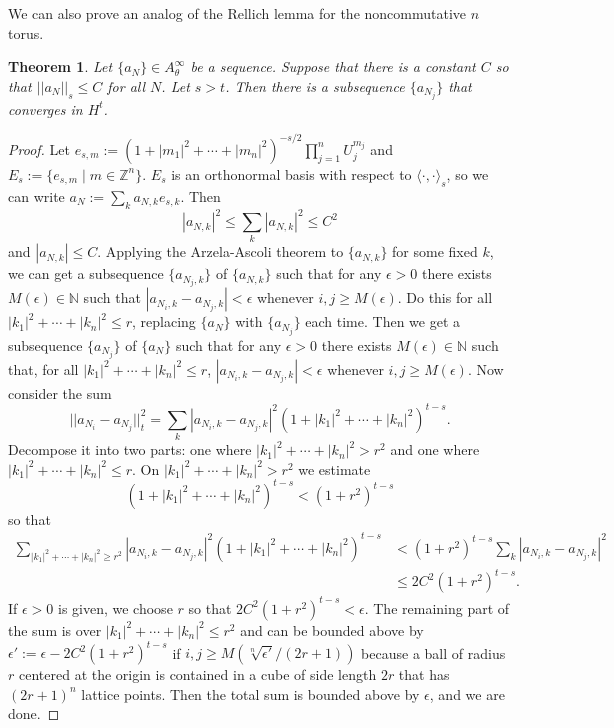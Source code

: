\documentclass[10pt]{article}
\newtheorem{thm}{Theorem}[section]
\theoremstyle{remark}
\theoremstyle{definition}
\begin{document}
We can also prove an analog of the Rellich lemma for the noncommutative
$n$ torus.
\begin{thm}
Let $\{a_N\}\in A_{\theta}^{\infty}$ be a sequence. Suppose that there
is a constant $C$ so that $||a_N||_s\le C$ for all $N$. Let $s>t$. Then
there is a subsequence $\{a_{N_j}\}$ that converges in $H^t$.
\end{thm}
\begin{proof}
Let $e_{s,m}:=(1+|m_1|^2+\cdots+|m_n|^2)^{-s/2}\prod_{j=1}^nU_j^{m_j}$ and
$E_s:=\{e_{s,m}\mid m\in\mathbb Z^n\}$. $E_s$ is an orthonormal basis
with respect to $\langle\cdot,\cdot\rangle_s$, so we can write
$a_N:=\sum_ka_{N,k}e_{s,k}$. Then
$$|a_{N,k}|^2\le\sum_k|a_{N,k}|^2\le C^2$$
and $|a_{N,k}|\le C$.
Applying the Arzela-Ascoli theorem to $\{a_{N,k}\}$ for some fixed
$k$, we can get a subsequence $\{a_{N_j,k}\}$ of $\{a_{N,k}\}$
such that for any $\epsilon>0$ there exists $M(\epsilon)\in\mathbb N$
such that $|a_{N_i,k}-a_{N_j,k}|<\epsilon$ whenever
$i,j\ge M(\epsilon)$.
Do this for all $|k_1|^2+\cdots+|k_n|^2\le r$,
replacing $\{a_N\}$ with $\{a_{N_j}\}$
each time. Then we get a subsequence $\{a_{N_j}\}$ of $\{a_N\}$
such that for any $\epsilon>0$ there exists $M(\epsilon)\in\mathbb N$
such that, for all $|k_1|^2+\cdots+|k_n|^2\le r$,
$|a_{N_i,k}-a_{N_j,k}|<\epsilon$ whenever $i,j\ge M(\epsilon)$.
Now consider the sum $$||a_{N_i}-a_{N_j}||_t^2
=\sum_k|a_{N_i,k}-a_{N_j,k}|^2(1+|k_1|^2+\cdots+|k_n|^2)^{t-s}.$$
Decompose it into two parts: one where $|k_1|^2+\cdots+|k_n|^2>r^2$ and one
where $|k_1|^2+\cdots+|k_n|^2\le r$. On $|k_1|^2+\cdots+|k_n|^2>r^2$ we estimate
$$(1+|k_1|^2+\cdots+|k_n|^2)^{t-s}<(1+r^2)^{t-s}$$ so that
\begin{align*}
\sum_{|k_1|^2+\cdots+|k_n|^2\ge r^2}|a_{N_i,k}-a_{N_j,k}|^2
(1+|k_1|^2+\cdots+|k_n|^2)^{t-s}
&<(1+r^2)^{t-s}\sum_k|a_{N_i,k}-a_{N_j,k}|^2 \\
&\le2C^2(1+r^2)^{t-s}.
\end{align*}
If $\epsilon>0$ is given, we choose $r$ so that $2C^2(1+r^2)^{t-s}<\epsilon$.
The remaining part of the sum is over $|k_1|^2+\cdots+|k_n|^2\le r^2$ and
can be bounded above by
$\epsilon':=\epsilon-2C^2(1+r^2)^{t-s}$ if
$i,j\ge M(\sqrt[n]{\epsilon'}/(2r+1))$
because a ball of radius $r$ centered at the origin is contained in a cube
of side length $2r$ that has $(2r+1)^n$ lattice points.
Then the total sum is bounded above by $\epsilon$, and we are done.
\end{proof}
\end{document}
